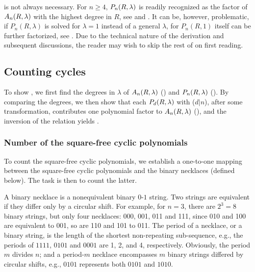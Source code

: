 \documentclass{ws-ijbc}
\begin{document}
 is not always necessary.
For $n \ge 4$,
  $P_n(R, \lambda)$ is readily recognized as
  the factor
  of $A_n(R, \lambda)$
  with the highest degree in $R$,
  see  and .
It can be, however, problematic,
   if $P_n(R, \lambda)$ is solved for $\lambda = 1$
   instead of a general $\lambda$,
   for $P_n(R, 1)$ itself can be further factorized,
  see .
%
Due to the technical nature of the derivation and subsequent discussions,
  the reader may wish to skip the rest of 
  on first reading.






\subsection{\label{sec:degprimfac}Counting cycles}



%
To show , we first find the degrees in $\lambda$ of
  $A_n(R, \lambda)$ () and $P_n(R, \lambda)$ ().
By comparing the degrees,
  we then show that each $P_d(R, \lambda)$ with ($d|n$),
  after some transformation,
  contributes one polynomial factor to $A_n(R, \lambda)$
  (),
  and the inversion of the relation
  yields .

\subsubsection{Number of the square-free cyclic polynomials}

To count the square-free cyclic polynomials,
  we establish a one-to-one mapping
  between the square-free cyclic polynomials
  and the binary necklaces (defined below).
The task is then to count the latter.

A binary necklace
  is a nonequivalent binary $0$-$1$ string.
%
Two strings are equivalent if they differ only by a circular shift.
%
For example, for $n = 3$, there are $2^3 = 8$ binary strings,
but only four necklaces: 000, 001, 011 and 111,
since 010 and 100 are equivalent to 001,
so are 110 and 101 to 011.
%
The period of a necklace, or a binary string,
  is the length of the shortest non-repeating sub-sequence,
  e.g., the periods of $1111$, $0101$ and $0001$
        are 1, 2, and 4, respectively.
%
Obviously, the period $m$ divides $n$;
  and a period-$m$ necklace
  encompasses $m$ binary strings
  differed by circular shifts,
  e.g., $0101$ represents
  both $0101$ and $1010$.
\end{document}
